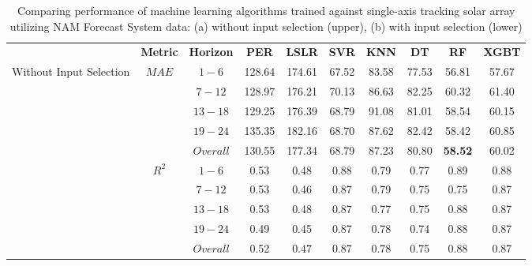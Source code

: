 \begin{table}[h]
\begin{center}
    \caption[Comparing performance of machine learning algorithms trained against single-axis tracking array using NAM Forecast System data, with and without input selection.]{Comparing performance of machine learning algorithms trained against single-axis tracking solar array utilizing NAM Forecast System data: (a) without input selection (upper), (b) with input selection (lower)}
    \label{Tab:fs_array_e}
    \begin{tabular}{@{}p{5.3em}ccccccccc@{}}
    \toprule
    & \textbf{Metric} & \textbf{Horizon} & \textbf{PER} & \textbf{LSLR} & \textbf{SVR} & \textbf{KNN} & \textbf{DT} & \textbf{RF} & \textbf{XGBT} \\ \cmidrule(l){1-10} 
    \multirow{10}{5em}{Without Input Selection} & \multirow{5}{*}{$MAE$} & $1 - 6$ & 128.64 & 174.61 & 67.52 & 83.58 & 77.53 & 56.81 & 57.67 \\
                                              &                   & $7 - 12$ & 128.97 & 176.21 & 70.13 & 86.63 & 82.25 & 60.32 & 61.40 \\
                                              &                   & $13 - 18$ & 129.25 & 176.39 & 68.79 & 91.08 & 81.01 & 58.54 & 60.15 \\
                                              &                   & $19 - 24$ & 135.35 & 182.16 & 68.70 & 87.62 & 82.42 & 58.42 & 60.85 \\
                                              &                   & $Overall$ & 130.55 & 177.34 & 68.79 & 87.23 & 80.80 & \textbf{58.52} & 60.02 \\ \cmidrule(lr){2-10}
                                              & \multirow{5}{*}{$R^2$} & $1 - 6$ & 0.53 & 0.48 & 0.88 & 0.79 & 0.77 & 0.89 & 0.88 \\
                                              &                   & $7 - 12$ & 0.53 & 0.46 & 0.87 & 0.79 & 0.75 & 0.75 & 0.87 \\
                                              &                   & $13 - 18$ & 0.53 & 0.48 & 0.87 & 0.77 & 0.75 & 0.88 & 0.87 \\
                                              &                   & $19 - 24$ & 0.49 & 0.45 & 0.87 & 0.78 & 0.74 & 0.88 & 0.87 \\
                                              &                   & $Overall$ & 0.52 & 0.47 & 0.87 & 0.78 & 0.75 & 0.88 & 0.87 \\ 

\end{tabular}
\end{center}
\end{table}
